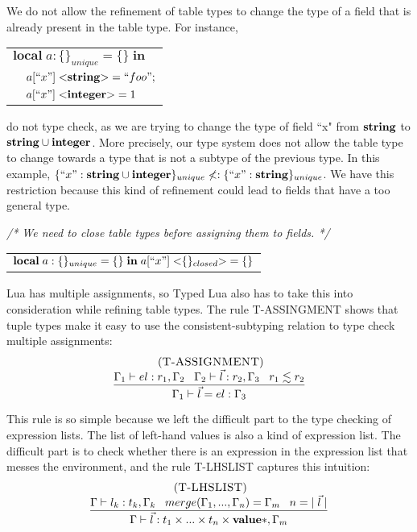 We do not allow the refinement of table types to change the type of
a field that is already present in the table type.
For instance,
\begin{center}
\begin{tabular}{ll}
\multicolumn{2}{l}{$\mathbf{local} \; a:\{\}_{unique} = \{\} \; \mathbf{in}$}\\
& \multicolumn{1}{l}{$a[``x"] \; {<}\mathbf{string}{>} = ``foo";$}\\
& \multicolumn{1}{l}{$a[``x"] \; {<}\mathbf{integer}{>} = 1$}\\
\end{tabular}
\end{center}
do not type check, as we are trying to change the type of field
``x" from $\mathbf{string}$ to $\mathbf{string} \cup \mathbf{integer}$.
More precisely, our type system does not allow the table type to
change towards a type that is not a subtype of the previous type.
In this example,
$\{``x":\mathbf{string} \cup \mathbf{integer}\}_{unique} \not<: \{``x":\mathbf{string}\}_{unique}$.
We have this restriction because this kind of refinement could lead
to fields that have a too general type.

\textit{/* We need to close table types before assigning them to fields. */}
\begin{center}
\begin{tabular}{l}
$\mathbf{local} \; a:\{\}_{unique} = \{\} \; \mathbf{in} \; a[``x"] \; {<}\{\}_{closed}{>} = \{\}$
\end{tabular}
\end{center}

Lua has multiple assignments, so Typed Lua also has to take this into
consideration while refining table types.
The rule \textsc{T-ASSINGMENT} shows that tuple types make it easy
to use the consistent-subtyping relation to type check multiple assignments:
\[
\begin{array}{c}
\; (\textsc{T-ASSIGNMENT})\\
\begin{array}{c}
\dfrac{\Gamma_{1} \vdash el:r_{1}, \Gamma_{2} \;\;\;
       \Gamma_{2} \vdash \vec{l}:r_{2}, \Gamma_{3} \;\;\;
       r_{1} \lesssim r_{2}}
      {\Gamma_{1} \vdash \vec{l} = el:\Gamma_{3}}
\end{array}
\end{array}
\]

This rule is so simple because we left the difficult part to the
type checking of expression lists.
The list of left-hand values is also a kind of expression list.
The difficult part is to check whether there is an expression in
the expression list that messes the environment, and the rule
\textsc{T-LHSLIST} captures this intuition:
\[
\begin{array}{c}
\; (\textsc{T-LHSLIST})\\
\dfrac{\Gamma \vdash l_{k}:t_{k}, \Gamma_{k} \;\;\;
       merge(\Gamma_{1}, ..., \Gamma_{n}) = \Gamma_{m} \;\;\;
       n = |\;\vec{l}\;|}
      {\Gamma \vdash \vec{l}:t_{1} \times ... \times t_{n} \times \mathbf{value}{*}, \Gamma_{m}}
\end{array}
\]

